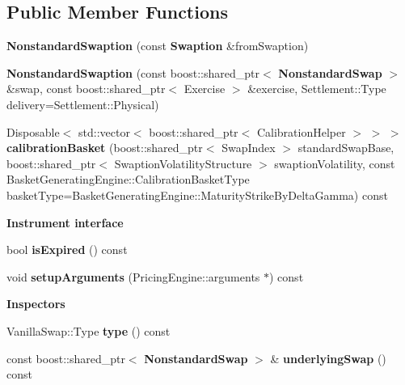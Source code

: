 \subsection*{Public Member Functions}
\begin{DoxyCompactItemize}
\item 
{\bfseries Nonstandard\+Swaption} (const {\bf Swaption} \&from\+Swaption)\label{class_quant_lib_1_1_nonstandard_swaption_a35fed795c326893fde32a8d0edfe51fd}

\item 
{\bfseries Nonstandard\+Swaption} (const boost\+::shared\+\_\+ptr$<$ {\bf Nonstandard\+Swap} $>$ \&swap, const boost\+::shared\+\_\+ptr$<$ Exercise $>$ \&exercise, Settlement\+::\+Type delivery=Settlement\+::\+Physical)\label{class_quant_lib_1_1_nonstandard_swaption_a1ffc37dfe062c29d638923e73a609fe7}

\item 
Disposable$<$ std\+::vector$<$ boost\+::shared\+\_\+ptr$<$ Calibration\+Helper $>$ $>$ $>$ {\bfseries calibration\+Basket} (boost\+::shared\+\_\+ptr$<$ Swap\+Index $>$ standard\+Swap\+Base, boost\+::shared\+\_\+ptr$<$ Swaption\+Volatility\+Structure $>$ swaption\+Volatility, const Basket\+Generating\+Engine\+::\+Calibration\+Basket\+Type basket\+Type=Basket\+Generating\+Engine\+::\+Maturity\+Strike\+By\+Delta\+Gamma) const \label{class_quant_lib_1_1_nonstandard_swaption_ad6db84375780ecaf4d43534449bc63bd}

\end{DoxyCompactItemize}
\begin{Indent}{\bf Instrument interface}\par
\begin{DoxyCompactItemize}
\item 
bool {\bfseries is\+Expired} () const \label{class_quant_lib_1_1_nonstandard_swaption_a87ef2e42ba2dc2b88df681ca1c93ce59}

\item 
void {\bfseries setup\+Arguments} (Pricing\+Engine\+::arguments $\ast$) const \label{class_quant_lib_1_1_nonstandard_swaption_a07b1fa0986a2be6418388139f4fa3899}

\end{DoxyCompactItemize}
\end{Indent}
\begin{Indent}{\bf Inspectors}\par
\begin{DoxyCompactItemize}
\item 
Vanilla\+Swap\+::\+Type {\bfseries type} () const \label{class_quant_lib_1_1_nonstandard_swaption_a6b926a231b6f51a8232d3d5abff187ef}

\item 
const boost\+::shared\+\_\+ptr$<$ {\bf Nonstandard\+Swap} $>$ \& {\bfseries underlying\+Swap} () const \label{class_quant_lib_1_1_nonstandard_swaption_a41cf6142aba589d3f5b224b935ed6e53}

\end{DoxyCompactItemize}
\end{Indent}


